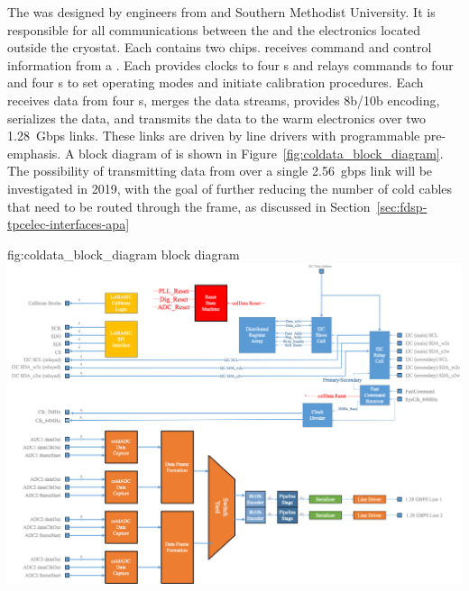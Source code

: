 The   was designed by engineers from  
and Southern Methodist University. It is responsible for all communications 
between the  and the electronics located outside the cryostat. 
Each  contains two  chips.  receives 
command and control information from a . Each  provides 
clocks to four s and relays commands to four  
  and four s to set operating modes and 
initiate calibration procedures.  Each  receives data from four 
s, merges the data streams, provides 8b/10b encoding, serializes 
the data, and transmits the data to the warm electronics over two \SI{1.28}{Gbps} 
links.  These links are driven by line drivers with programmable pre-emphasis. 
A block diagram of  is shown in Figure~\ref{fig:coldata_block_diagram}.
The possibility of transmitting data from  over a single 
\SI{2.56}{gbps} link will be investigated in 2019, with the goal of further
reducing the number of cold cables that need to be routed through the
 frame, as discussed in Section~\ref{sec:fdsp-tpcelec-interfaces-apa}

\begin{dunefigure}
{fig:coldata_block_diagram}
{ block diagram}
\includegraphics[width=1.0\linewidth]{graphics/coldata_block_diagram.png}
\end{dunefigure}

